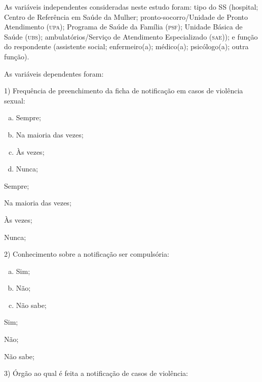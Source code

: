 \documentclass{article}
\begin{document}
As variáveis independentes consideradas neste estudo foram: tipo do SS
(hospital; Centro de Referência em Saúde da Mulher; pronto-socorro/Unidade de
Pronto Atendimento (\textsc{upa}); Programa de Saúde da Família (\textsc{psf}); Unidade Básica de
Saúde (\textsc{ubs}); ambulatórios/Serviço de Atendimento Especializado (\textsc{sae})); e função
do respondente (assistente social; enfermeiro(a); médico(a); psicólogo(a); outra
função).

As variáveis dependentes foram:

1) Frequência de preenchimento da ficha de notificação em casos de violência
sexual:

\begin{enumerate}[a)]
\item
Sempre;

\item
Na maioria das vezes;

\item
Às vezes;

\item
Nunca;

\end{enumerate}

Sempre;

Na maioria das vezes;

Às vezes;

Nunca;

2) Conhecimento sobre a notificação ser compulsória:

\begin{enumerate}[a)]
\item
Sim;

\item
Não;

\item
Não sabe;

\end{enumerate}

Sim;

Não;

Não sabe;

3) Órgão ao qual é feita a notificação de casos de violência:
\end{document}
